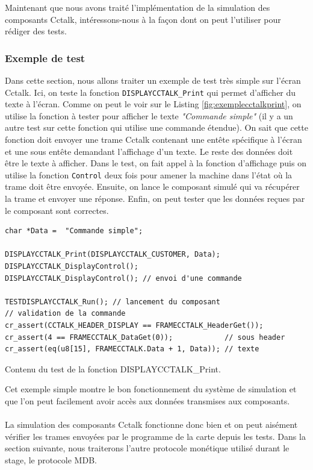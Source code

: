 \documentclass[a4paper]{article}
\begin{document}
Maintenant que nous avons traité l'implémentation de la simulation des
composants Cctalk, intéressons-nous à la façon dont on peut l'utiliser pour
rédiger des tests.

\subsubsection{Exemple de test}

Dans cette section, nous allons traiter un exemple de test très simple sur
l'écran Cctalk. Ici, on teste la fonction \verb|DISPLAYCCTALK_Print| qui permet
d'afficher du texte à l'écran. Comme on peut le voir sur le Listing
\ref{fig:exemplecctalkprint}, on utilise la fonction à tester pour afficher le
texte \textit{"Commande simple"} (il y a un autre test sur cette fonction qui
utilise une commande étendue). On sait que cette fonction doit envoyer une trame
Cctalk contenant une entête spécifique à l'écran et une sous entête demandant
l'affichage d'un texte. Le reste des données doit être le texte à afficher. Dans
le test, on fait appel à la fonction d'affichage puis on utilise la fonction
\verb|Control| deux fois pour amener la machine dans l'état où la trame doit
être envoyée. Ensuite, on lance le composant simulé qui va récupérer la trame et
envoyer une réponse. Enfin, on peut tester que les données reçues par le composant
sont correctes.

\begin{listing}[ht!]
\begin{verbatim}
char *Data =  "Commande simple";

DISPLAYCCTALK_Print(DISPLAYCCTALK_CUSTOMER, Data);
DISPLAYCCTALK_DisplayControl();
DISPLAYCCTALK_DisplayControl(); // envoi d'une commande

TESTDISPLAYCCTALK_Run(); // lancement du composant
// validation de la commande
cr_assert(CCTALK_HEADER_DISPLAY == FRAMECCTALK_HeaderGet());
cr_assert(4 == FRAMECCTALK_DataGet(0));            // sous header
cr_assert(eq(u8[15], FRAMECCTALK.Data + 1, Data)); // texte
\end{verbatim}
\caption{Contenu du test de la fonction DISPLAYCCTALK\_Print.}
\label{fig:exemplecctalkprint}
\end{listing}

Cet exemple simple montre le bon fonctionnement du système de simulation et que
l'on peut facilement avoir accès aux données transmises aux composants.
\\~\\

La simulation des composants Cctalk fonctionne donc bien et on peut aisément
vérifier les trames envoyées par le programme de la carte depuis les tests. Dans
la section suivante, nous traiterons l'autre protocole monétique utilisé durant
le stage, le protocole MDB.
\end{document}
